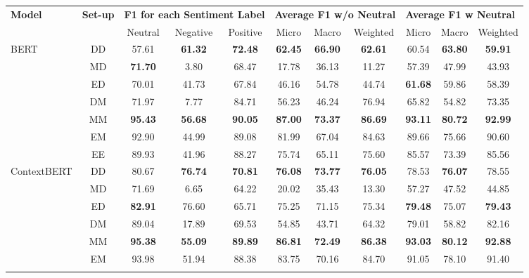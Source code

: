 \documentclass[10pt, a4paper]{article}
\begin{document}
\begin{table}[H]
\centering
\small
\setlength\tabcolsep{4pt}

\begin{tabular}{l|c|ccc|ccc|ccc}
\toprule[1pt]
\multirow{2}{*}{\textbf{Model}} & \multirow{2}{*}{\textbf{Set-up}} & \multicolumn{3}{l|}{\textbf{F1 for each Sentiment Label}} & \multicolumn{3}{l|}{\textbf{Average F1 w/o Neutral}} & \multicolumn{3}{l}{\textbf{Average F1 w Neutral}} \\ 
 &  & Neutral & Negative & Positive & Micro & Macro & Weighted & Micro & Macro & Weighted \\\hline
\multirow{7}{*}{BERT} & DD & 57.61 & \textbf{61.32} & \textbf{72.48} & \textbf{62.45} & \textbf{66.90} & \textbf{62.61} & 60.54 & \textbf{63.80} & \textbf{59.91} \\
 & MD & \textbf{71.70} & 3.80 & 68.47 & 17.78 & 36.13 & 11.27 & 57.39 & 47.99 & 43.93 \\
 & ED & 70.01 & 41.73 & 67.84 & 46.16 & 54.78 & 44.74 & \textbf{61.68} & 59.86 & 58.39 \\ \cline{2-11}
 & DM & 71.97 & 7.77 & 84.71 & 56.23 & 46.24 & 76.94 & 65.82 & 54.82 & 73.35 \\
 & MM & \textbf{95.43} & \textbf{56.68} & \textbf{90.05} & \textbf{87.00} & \textbf{73.37} & \textbf{86.69} & \textbf{93.11} & \textbf{80.72} & \textbf{92.99} \\
 & EM & 92.90 & 44.99 & 89.08 & 81.99 & 67.04 & 84.63 & 89.66 & 75.66 & 90.60 \\ \cline{2-11}
 & EE & 89.93 & 41.96 & 88.27 & 75.74 & 65.11 & 75.60 & 85.57 & 73.39 & 85.56 \\\hline\hline
\multirow{7}{*}{ContextBERT} & DD & 80.67 & \textbf{76.74} & \textbf{70.81} & \textbf{76.08} & \textbf{73.77} & \textbf{76.05} & 78.53 & \textbf{76.07} & 78.55 \\
 & MD & 71.69 & 6.65 & 64.22 & 20.02 & 35.43 & 13.30 & 57.27 & 47.52 & 44.85 \\
 & ED & \textbf{82.91} & 76.60 & 65.71 & 75.25 & 71.15 & 75.34 & \textbf{79.48} & 75.07 & \textbf{79.43} \\\cline{2-11}
 & DM & 89.04 & 17.89 & 69.53 & 54.85 & 43.71 & 64.32 & 79.01 & 58.82 & 82.16 \\
 & MM & \textbf{95.38} & \textbf{55.09} & \textbf{89.89} & \textbf{86.81} & \textbf{72.49} & \textbf{86.38} & \textbf{93.03} & \textbf{80.12} & \textbf{92.88} \\
 & EM & 93.98 & 51.94 & 88.38 & 83.75 & 70.16 & 84.70 & 91.05 & 78.10 & 91.40 \\ \cline{2-11}

\end{tabular}
\end{table}
\end{document}
